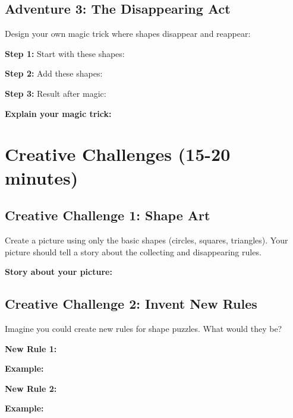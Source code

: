 \documentclass{article}
\begin{document}
\subsection*{Adventure 3: The Disappearing Act}
Design your own magic trick where shapes disappear and reappear:

\textbf{Step 1:} Start with these shapes: \underline{\hspace{6cm}}

\textbf{Step 2:} Add these shapes: \underline{\hspace{6cm}}

\textbf{Step 3:} Result after magic: \underline{\hspace{6cm}}

\textbf{Explain your magic trick:} \underline{\hspace{8cm}}

\section{Creative Challenges (15-20 minutes)}

\subsection*{Creative Challenge 1: Shape Art}
Create a picture using only the basic shapes (circles, squares, triangles). Your picture should tell a story about the collecting and disappearing rules.

\vspace{6cm}

\textbf{Story about your picture:} \underline{\hspace{8cm}}

\subsection*{Creative Challenge 2: Invent New Rules}
Imagine you could create new rules for shape puzzles. What would they be?

\textbf{New Rule 1:} \underline{\hspace{8cm}}

\textbf{Example:} \underline{\hspace{8cm}}

\textbf{New Rule 2:} \underline{\hspace{8cm}}

\textbf{Example:} \underline{\hspace{8cm}}
\end{document}
